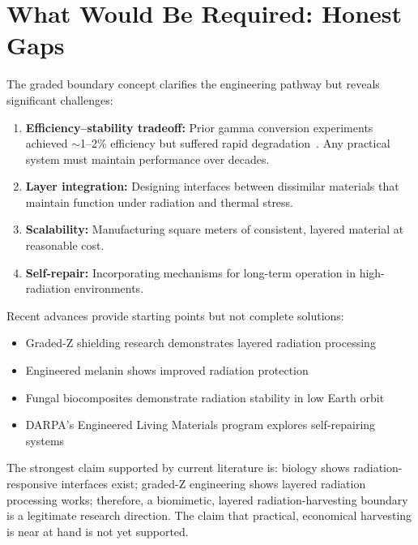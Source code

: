 \documentclass[12pt]{article}
\begin{document}
\section{What Would Be Required: Honest Gaps}

The graded boundary concept clarifies the engineering pathway but reveals significant
challenges:

\begin{enumerate}
    \item \textbf{Efficiency--stability tradeoff:} Prior gamma conversion experiments
    achieved $\sim$1--2\% efficiency but suffered rapid degradation~\cite{tanabe2010}.
    Any practical system must maintain performance over decades.

    \item \textbf{Layer integration:} Designing interfaces between dissimilar materials
    that maintain function under radiation and thermal stress.

    \item \textbf{Scalability:} Manufacturing square meters of consistent, layered
    material at reasonable cost.

    \item \textbf{Self-repair:} Incorporating mechanisms for long-term operation in
    high-radiation environments.
\end{enumerate}

Recent advances provide starting points but not complete solutions:
\begin{itemize}
    \item Graded-Z shielding research demonstrates layered radiation processing~\cite{atwell2013}
    \item Engineered melanin shows improved radiation protection~\cite{deng2025}
    \item Fungal biocomposites demonstrate radiation stability in low Earth orbit~\cite{casadevall2025}
    \item DARPA's Engineered Living Materials program explores self-repairing systems~\cite{darpa2025}
\end{itemize}

The strongest claim supported by current literature is: biology shows radiation-responsive
interfaces exist; graded-Z engineering shows layered radiation processing works;
therefore, a biomimetic, layered radiation-harvesting boundary is a legitimate research
direction. The claim that practical, economical harvesting is near at hand is not yet
supported.
\end{document}
